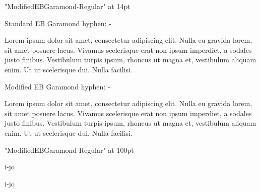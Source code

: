 \fontfam[ebgaramond]
\typosize[14/18]

\hsize=50mm
\parskip\baselineskip
\parindent0pt

\font\modeb "ModifiedEBGaramond-Regular" at 14pt\relax

Standard EB Garamond hyphen: {-}\par

Lorem ipsum dolor sit amet, consectetur adipiscing elit. Nulla eu gravida lorem, sit amet posuere lacus. Vivamus scelerisque erat non ipsum imperdiet, a sodales justo finibus. Vestibulum turpis ipsum, rhoncus ut magna et, vestibulum aliquam enim. Ut ut scelerisque dui. Nulla facilisi. 

\modeb

Modified EB Garamond hyphen: -

Lorem ipsum dolor sit amet, consectetur adipiscing elit. Nulla eu gravida lorem, sit amet posuere lacus. Vivamus scelerisque erat non ipsum imperdiet, a sodales justo finibus. Vestibulum turpis ipsum, rhoncus ut magna et, vestibulum aliquam enim. Ut ut scelerisque dui. Nulla facilisi. 

\vfil\break

{\font\bigmodeb "ModifiedEBGaramond-Regular" at 100pt\bigmodeb

i-jo\par}
\typosize[100/100]
i-jo\par

\bye

